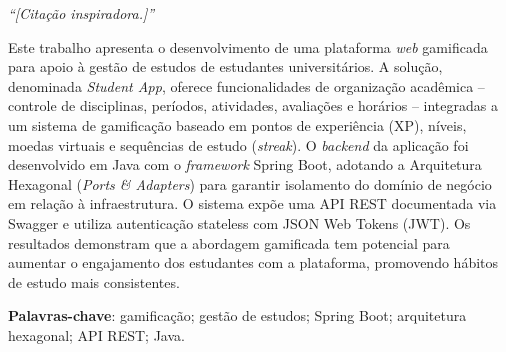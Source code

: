 \documentclass[
  12pt,             %
  openright,        %
  twoside,          %
  a4paper,          %
  english,          %
  brazilian         %
]{abntex2}
\begin{document}
\begin{epigrafe}
  \vspace*{\fill}
  \begin{flushright}
    \textit{``[Citação inspiradora.]''}\\
    [Autor da citação]
  \end{flushright}
\end{epigrafe}

\setlength{\absparsep}{18pt}
\begin{resumo}
  Este trabalho apresenta o desenvolvimento de uma plataforma \textit{web} gamificada
  para apoio à gestão de estudos de estudantes universitários. A solução, denominada
  \textit{Student App}, oferece funcionalidades de organização acadêmica -- controle de
  disciplinas, períodos, atividades, avaliações e horários -- integradas a um sistema
  de gamificação baseado em pontos de experiência (XP), níveis, moedas virtuais e
  sequências de estudo (\textit{streak}). O \textit{backend} da aplicação foi
  desenvolvido em Java com o \textit{framework} Spring Boot, adotando a Arquitetura
  Hexagonal (\textit{Ports \& Adapters}) para garantir isolamento do domínio de negócio
  em relação à infraestrutura. O sistema expõe uma API REST documentada via Swagger e
  utiliza autenticação stateless com JSON Web Tokens (JWT). Os resultados demonstram
  que a abordagem gamificada tem potencial para aumentar o engajamento dos estudantes
  com a plataforma, promovendo hábitos de estudo mais consistentes.

  \vspace{\onelineskip}
  \noindent
  \textbf{Palavras-chave}: gamificação; gestão de estudos; Spring Boot; arquitetura
  hexagonal; API REST; Java.
\end{resumo}
\end{document}
